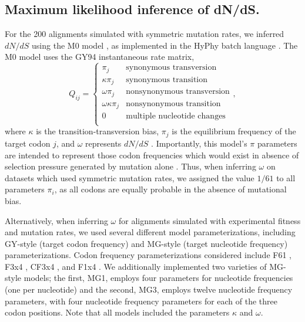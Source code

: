 \documentclass[11pt]{article}
\begin{document}
\subsection*{Maximum likelihood inference of dN/dS.}
For the 200 alignments simulated with symmetric mutation rates, we inferred $dN/dS$ using the M0 model \cite{Yangetal2000}, as implemented in the HyPhy batch language \cite{KosakovskyPondetal2005}. The M0 model uses the GY94 instantaneous rate matrix,
\begin{equation}\label{eq:GY94}
Q_{ij} = \left\{ 
	\begin{array}{rl}
	\pi_j                  &\mbox{synonymous transversion} \\
	\kappa \pi_j           &\mbox{synonymous transition} \\
 	\omega \pi_j           &\mbox{nonsynonymous transversion} \\
 	\omega \kappa \pi_j    &\mbox{nonsynonymous transition} \\
	0                      &\mbox{multiple nucleotide changes} \\             
	\end{array} \right.,
\end{equation}
where $\kappa$ is the transition-transversion bias, $\pi_j$ is the equilibrium frequency of the target codon $j$, and $\omega$ represents $dN/dS$ \cite{GoldmanYang1994,NielsenYang1998}. Importantly, this model's $\pi$ parameters are intended to represent those codon frequencies which would exist in absence of selection pressure generated by mutation alone \cite{GoldmanYang1994,MuseGaut1994,YN00,Yang2006}. Thus, when inferring $\omega$ on datasets which used symmetric mutation rates, we assigned the value $1/61$ to all parameters $\pi_i$, as all codons are  equally probable in the absence of mutational bias.

Alternatively, when inferring $\omega$ for alignments simulated with experimental fitness and mutation rates, we used several different model parameterizations, including GY-style \cite{GoldmanYang1994} (target codon frequency) and MG-style \cite{MuseGaut1994} (target nucleotide frequency) parameterizations. Codon frequency parameterizations considered include F61 \cite{GoldmanYang1994}, F3x4 \cite{GoldmanYang1994}, CF3x4 \cite{KosakovskyPond2010}, and F1x4 \cite{MuseGaut1994}. We additionally implemented two varieties of MG-style models; the first, MG1, employs four parameters for nucleotide frequencies (one per nucleotide) and the second, MG3, employs twelve nucleotide frequency parameters, with four nucleotide frequency parameters for each of the three codon positions. Note that all models included the parameters $\kappa$ and $\omega$. 
\end{document}

